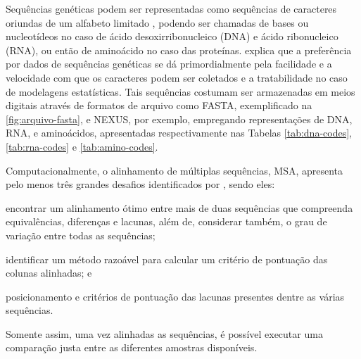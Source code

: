 \documentclass[english,brazilian]{UNISINOSmonografia} %
\begin{document}
Sequências genéticas podem ser representadas como sequências de caracteres oriundas de um alfabeto limitado \cite{DarribaPHD}, podendo ser chamadas de bases ou nucleotídeos no caso de ácido desoxirribonucleico (DNA) e ácido ribonucleico (RNA), ou então de aminoácido no caso das proteínas.
 explica que a preferência por dados de sequências genéticas se dá primordialmente pela facilidade e a velocidade com que os caracteres podem ser coletados e a tratabilidade no caso de modelagens estatísticas.
Tais sequências costumam ser armazenadas em meios digitais através de formatos de arquivo como FASTA, exemplificado na \autoref{fig:arquivo-fasta}, e NEXUS, por exemplo, empregando representações de DNA, RNA, e aminoácidos, apresentadas respectivamente nas Tabelas \ref{tab:dna-codes}, \ref{tab:rna-codes} e \ref{tab:amino-codes}.


%
%
%


Computacionalmente, o alinhamento de múltiplas sequências, MSA, apresenta pelo menos três grandes desafios identificados por , sendo eles: \begin{inparaenum} 
	\item encontrar um alinhamento ótimo entre mais de duas sequências que compreenda equivalências, diferenças e lacunas, além de, considerar também, o grau de variação entre todas as sequências;
	\item identificar um método razoável para calcular um critério de pontuação das colunas alinhadas; e
	\item posicionamento e critérios de pontuação das lacunas presentes dentre as várias sequências.
\end{inparaenum}
Somente assim, uma vez alinhadas as sequências, é possível executar uma comparação justa entre as diferentes amostras disponíveis.
\end{document}
